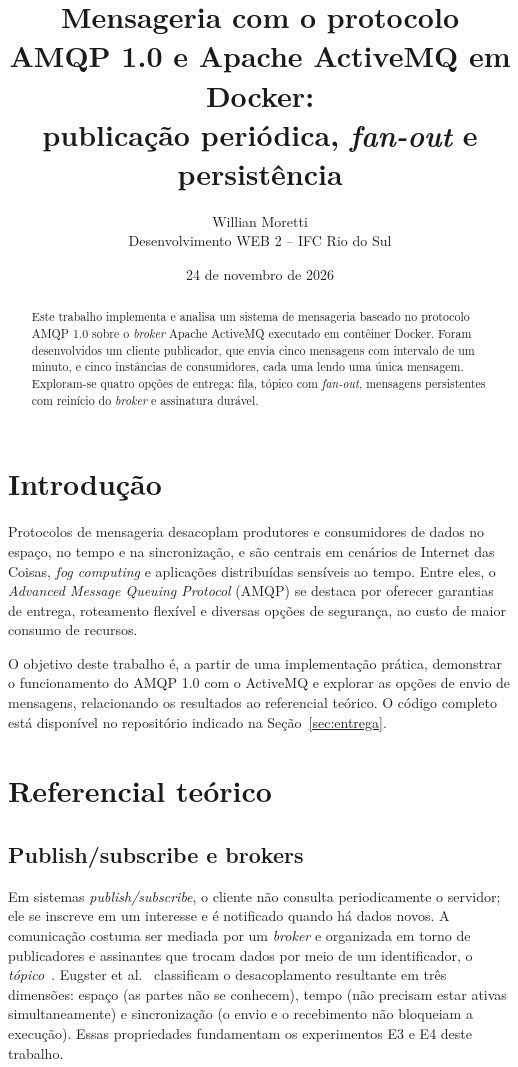 \documentclass[12pt,a4paper]{article}
\title{Mensageria com o protocolo AMQP 1.0 e Apache ActiveMQ em Docker:\\
publicação periódica, \textit{fan-out} e persistência}
\author{Willian Moretti\\ Desenvolvimento WEB 2 -- IFC Rio do Sul}
\date{24 de novembro de 2026}
\begin{document}
\maketitle

\begin{abstract}
Este trabalho implementa e analisa um sistema de mensageria baseado no protocolo AMQP 1.0 sobre o \textit{broker} Apache ActiveMQ executado em contêiner Docker. Foram desenvolvidos um cliente publicador, que envia cinco mensagens com intervalo de um minuto, e cinco instâncias de consumidores, cada uma lendo uma única mensagem. Exploram-se quatro opções de entrega: fila, tópico com \textit{fan-out}, mensagens persistentes com reinício do \textit{broker} e assinatura durável.
\end{abstract}

\section{Introdução}
Protocolos de mensageria desacoplam produtores e consumidores de dados no espaço, no tempo e na sincronização, e são centrais em cenários de Internet das Coisas, \textit{fog computing} e aplicações distribuídas sensíveis ao tempo. Entre eles, o \textit{Advanced Message Queuing Protocol} (AMQP) se destaca por oferecer garantias de entrega, roteamento flexível e diversas opções de segurança, ao custo de maior consumo de recursos.

O objetivo deste trabalho é, a partir de uma implementação prática, demonstrar o funcionamento do AMQP 1.0 com o ActiveMQ e explorar as opções de envio de mensagens, relacionando os resultados ao referencial teórico. O código completo está disponível no repositório indicado na Seção~\ref{sec:entrega}.

\section{Referencial teórico}
\subsection{Publish/subscribe e brokers}
Em sistemas \textit{publish/subscribe}, o cliente não consulta periodicamente o servidor; ele se inscreve em um interesse e é notificado quando há dados novos. A comunicação costuma ser mediada por um \textit{broker} e organizada em torno de publicadores e assinantes que trocam dados por meio de um identificador, o \textit{tópico}~\cite{bezerra2024}. Eugster et al.~\cite{eugster2003} classificam o desacoplamento resultante em três dimensões: espaço (as partes não se conhecem), tempo (não precisam estar ativas simultaneamente) e sincronização (o envio e o recebimento não bloqueiam a execução). Essas propriedades fundamentam os experimentos E3 e E4 deste trabalho.
\end{document}
